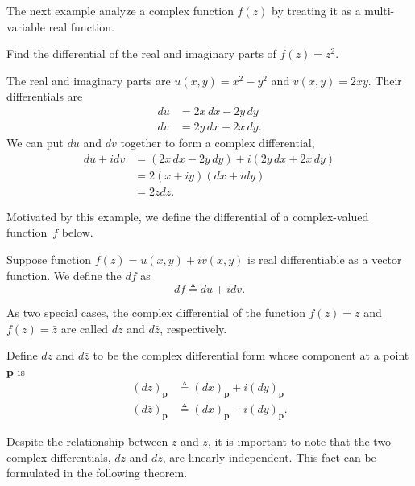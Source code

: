The next example analyze a complex function $f(z)$ by treating it as a multi-variable real function.
\begin{example} \label{ex:complex_differential}
	Find the differential of the real and imaginary parts of $f(z)=z^2$.
	
	The real and imaginary parts are $u(x,y) = x^2-y^2$ and $v(x,y)=2xy$. Their differentials are
	\begin{align*}
		du &= 2x\, dx - 2y\, dy \\
		dv &= 2y\, dx+ 2x\, dy.
	\end{align*}
	We can put $du$ and $dv$ together to form a complex differential,
	\begin{align*}
		du+i dv &= (2x\, dx - 2y\, dy)+i(2y\, dx + 2x\, dy) \\
		&= 2 (x+iy)(dx+idy) \\
		&= 2z dz.
	\end{align*}
\end{example}

Motivated by this example, we define the differential of a complex-valued function~$f$ below.

\begin{svgraybox}
	\begin{definition} \label{def:df_complex} 
		Suppose function $f(z) = u(x,y) +iv(x,y)$  is real differentiable as a vector function. We define the  $df$ as 
		$$
		df \triangleq du + i dv.
		$$
	\end{definition}
\end{svgraybox}

As two special cases, the complex differential of the function $f(z) = z$ and $f(z)=\bar{z}$ are called $dz$ and $d\bar{z}$, respectively.

\begin{svgraybox}
	\begin{definition} 
		Define $dz$ and $d\bar{z}$ to be the complex differential form whose component at a point $\mathbf{p}$ is 
		\begin{align*}
			(dz)_\mathbf{p} & \triangleq (dx)_\mathbf{p} + i (dy)_\mathbf{p} \\
			(d\bar{z})_\mathbf{p} &\triangleq (dx)_\mathbf{p} - i (dy)_\mathbf{p}.
		\end{align*}
	\end{definition}
\end{svgraybox}

Despite the relationship between $z$ and $\bar{z}$, it is important to note that the two complex differentials, $dz$ and $d\bar{z}$, are linearly independent. This fact can be formulated in the following theorem.


